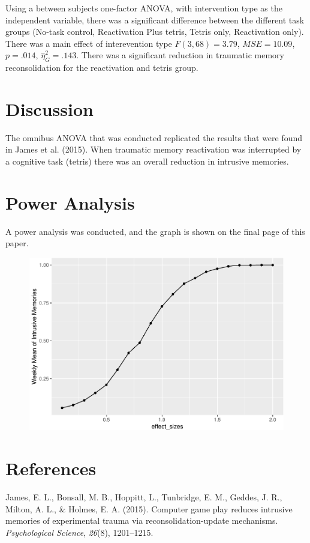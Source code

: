 \documentclass[man]{apa6}
\begin{document}
Using a between subjects one-factor ANOVA, with intervention type as the
independent variable, there was a significant difference between the
different task groups (No-task control, Reactivation Plus tetris, Tetris
only, Reactivation only). There was a main effect of interevention type
\(F(3, 68) = 3.79\), \(\mathit{MSE} = 10.09\), \(p = .014\),
\(\hat{\eta}^2_G = .143\). There was a significant reduction in
traumatic memory reconsolidation for the reactivation and tetris group.

\section{Discussion}\label{discussion}

The omnibus ANOVA that was conducted replicated the results that were
found in James et al. (2015). When traumatic memory reactivation was
interrupted by a cognitive task (tetris) there was an overall reduction
in intrusive memories.

\newpage

\section{Power Analysis}\label{power-analysis}

A power analysis was conducted, and the graph is shown on the final page
of this paper.

\begin{figure}
\centering
\includegraphics{Midterm_Paper_files/figure-latex/unnamed-chunk-2-1.pdf}
\caption{}
\end{figure}

\section{References}\label{references}

\begingroup
\setlength{\parindent}{-0.5in} \setlength{\leftskip}{0.5in}

\hypertarget{refs}{}
\hypertarget{ref-james2015computer}{}
James, E. L., Bonsall, M. B., Hoppitt, L., Tunbridge, E. M., Geddes, J.
R., Milton, A. L., \& Holmes, E. A. (2015). Computer game play reduces
intrusive memories of experimental trauma via reconsolidation-update
mechanisms. \emph{Psychological Science}, \emph{26}(8), 1201--1215.

\endgroup
\end{document}
